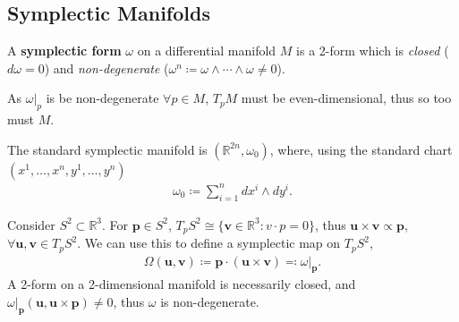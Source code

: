 \documentclass[11pt, final]{article}
\begin{document}
	
\subsection{Symplectic Manifolds}

\begin{definition}
	A \textbf{symplectic form} $\omega$ on a differential manifold $M$ is a 2-form which is \textit{closed} ($d\omega = 0$) and \textit{non-degenerate} ($\omega^n \coloneqq \omega \wedge \cdots \wedge \omega \neq 0$).
\end{definition}
\begin{remark}
	As $\omega|_p$ is be non-degenerate $\forall p \in M$, $T_pM$ must be even-dimensional, thus so too must $M$.
\end{remark}

\begin{example}
	The standard symplectic manifold is $\left( \mathbb{R}^{2n},\omega_0 \right)$, where, using the standard chart $(x^1, \ldots, x^n, y^1, \ldots, y^n)$
		\begin{align}
			\omega_0 \coloneqq \sum_{i=1}^n dx^i \wedge dy^i.
		\end{align}
\end{example}

\begin{example}
	Consider $S^2 \subset \mathbb{R}^3$. For $\mathbf{p} \in S^2$, $T_pS^2 \cong \{ \mathbf{v} \in \mathbb{R}^3 : v \cdot p = 0\}$, thus ${\mathbf{u} \times \mathbf{v}} \propto \mathbf{p}$, $\forall \mathbf{u}, \mathbf{v} \in T_pS^2$. We can use this to define a symplectic map on $T_pS^2$, 
		\begin{align}
			\Omega(\mathbf{u},\mathbf{v}) \coloneqq \mathbf{p} \cdot (\mathbf{u}\times\mathbf{v}) \eqqcolon \omega|_{\mathbf{p}}.
		\end{align}
	A 2-form on a 2-dimensional manifold is necessarily closed, and ${\omega|_\mathbf{p}(\mathbf{u},\mathbf{u}\times \mathbf{p}) \neq 0}$, thus $\omega$ is non-degenerate.
\end{example}
\end{document}
